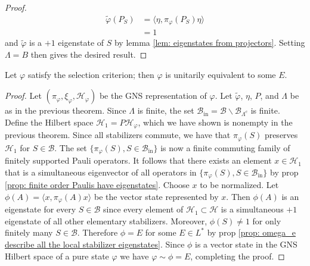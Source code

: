 \documentclass[11pt]{amsart}
\begin{document}
\begin{thm}
\begin{proof}
        \begin{align*}
            \tilde\varphi(P_S)&=\langle \eta, \pi_\varphi(P_S)\eta\rangle \\
            &=1
        \end{align*}
        and $\tilde\varphi$ is a $+1$ eigenstate of $S$ by lemma \ref{lem: eigenstates from projectors}. Setting $\Lambda=B$ then gives the desired result.  
    \end{proof}
\end{thm}
\begin{thm}\label{thm: selection criterion implies equivalence to some omega_e}
    Let $\varphi$ satisfy the selection criterion; then $\varphi$ is unitarily equivalent to some $E$.
    \begin{proof}
        Let $(\pi_\varphi,\xi_\varphi,\mathcal H_\varphi)$ be the GNS representation of $\varphi$. Let $\tilde \varphi$, $\eta$, $P$, and $\Lambda$ be as in the previous theorem. Since $\Lambda$ is finite, the set $\mathcal B_\text{in}=\mathcal B\backslash \mathcal B_{\Lambda^c}$ is finite. Define the Hilbert space $\mathcal H_1=P\mathcal H_\varphi$, which we have shown is nonempty in the previous theorem. Since all stabilizers commute, we have that $\pi_\varphi(S)$ preserves $\mathcal H_1$ for $S\in\mathcal B$. The set $\{\pi_\varphi(S), S\in\mathcal B_\text{in}\}$ is now a finite commuting family of finitely supported Pauli operators. It follows that there exists an element $x\in\mathcal H_1$ that is a simultaneous eigenvector of all operators in $\{\pi_\varphi(S), S\in\mathcal B_\text{in}\}$ by prop \ref{prop: finite order Paulis have eigenstates}. Choose $x$ to be normalized. Let $\phi(A)=\langle x,\pi _\varphi (A )x\rangle$ be the vector state represented by $x$. Then $\phi(A)$ is an eigenstate for every $S\in\mathcal B$ since every element of $\mathcal H_1\subset\mathcal H$ is a simultaneous $+1$ eigenstate of all other elementary stabilizers. Moreover, $\phi(S)\neq1$ for only finitely many $S\in\mathcal B$. Therefore $\phi=E$ for some $E\in L^*$ by prop \ref{prop: omega_e describe all the local stabilizer eigenstates}. Since $\phi$ is a vector state in the GNS Hilbert space of a pure state $\varphi$ we have $\varphi \sim \phi=E$, completing the proof. 
    \end{proof}
\end{thm}
\end{document}
